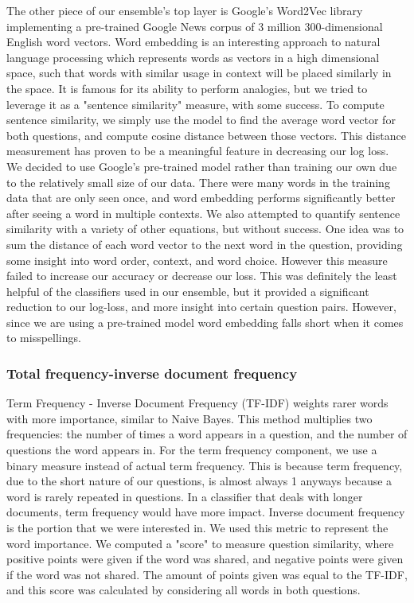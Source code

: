 \documentclass{article}
\begin{document}
The other piece of our ensemble's top layer is Google's Word2Vec library
implementing a pre-trained Google News corpus of 3 million 300-dimensional
English word vectors. Word embedding is an interesting approach to natural
language processing which represents words as vectors in a high dimensional
space, such that words with similar usage in context will be placed similarly in
the space. It is famous for its ability to perform analogies, but we tried to
leverage it as a "sentence similarity" measure, with some success. To compute
sentence similarity, we simply use the model to find the average word vector for
both questions, and compute cosine distance between those vectors. This distance
measurement has proven to be a meaningful feature in decreasing our log loss. We
decided to use Google's pre-trained model rather than training our own due to the
relatively small size of our data. There were many words in the training data
that are only seen once, and word embedding performs significantly better after
seeing a word in multiple contexts. We also attempted to quantify sentence
similarity with a variety of other equations, but without success. One idea was
to sum the distance of each word vector to the next word in the question,
providing some insight into word order, context, and word choice. However this
measure failed to increase our accuracy or decrease our loss. This was
definitely the least helpful of the classifiers used in our ensemble, but it
provided a significant reduction to our log-loss, and more insight into certain
question pairs. However, since we are using a pre-trained model word embedding
falls short when it comes to misspellings.

\subsubsection{Total frequency-inverse document frequency}

Term Frequency - Inverse Document Frequency (TF-IDF) weights rarer words with
more importance, similar to Naive Bayes. This method multiplies two frequencies:
the number of times a word appears in a question, and the number of questions
the word appears in. For the term frequency component, we use a binary measure
instead of actual term frequency. This is because term frequency, due to the
short nature of our questions, is almost always 1 anyways because a word is
rarely repeated in questions. In a classifier that deals with longer documents,
term frequency would have more impact. Inverse document frequency is the portion
that we were interested in. We used this metric to represent the word
importance. We computed a "score" to measure question similarity, where positive
points were given if the word was shared, and negative points were given if the
word was not shared. The amount of points given was equal to the TF-IDF, and
this score was calculated by considering all words in both questions.
\end{document}
